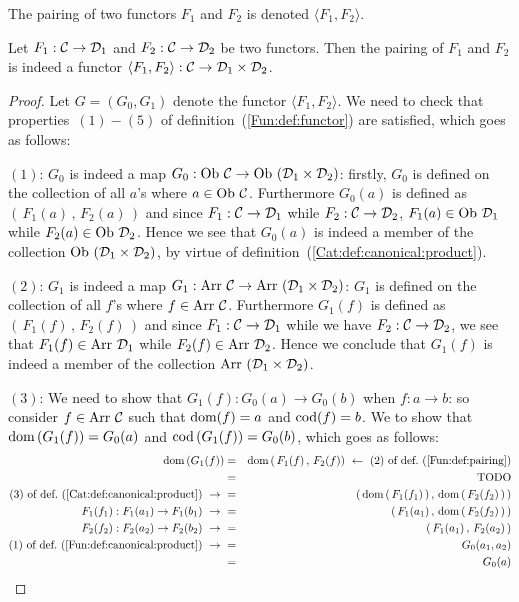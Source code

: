 \begin{notation}\label{Fun:notation:pairing}
    The pairing of two functors $F_{1}$ and $F_{2}$ is denoted
    $\langle F_{1}, F_{2}\rangle$.
\end{notation}
\begin{prop}\label{Fun:prop:pairing}
    Let $F_{1}:\mbox{$\cal C$}\to\mbox{${\cal D}_{1}$}$ and $F_{2}:\mbox{$\cal C$}\to\mbox{${\cal D}_{2}$}$ be two functors. Then 
    the pairing of $F_{1}$ and $F_{2}$ is indeed a functor 
    $\langle F_{1}, F_{2}\rangle : \mbox{$\cal C$}\to\mbox{${\cal D}_{1}$}\times\mbox{${\cal D}_{2}$}$.
\end{prop}
\begin{proof}
    Let $G=(G_{0},G_{1})$ denote the functor $\langle F_{1}, F_{2}\rangle$.
    We need to check that properties~$(1)-(5)$ of 
    definition~(\ref{Fun:def:functor}) are satisfied, which goes as follows:

    $(1)$: $G_{0}$ is indeed a map $G_{0}:\mbox{\rm Ob}\ \mbox{$\cal C$}\to\mbox{\rm Ob}\ (\mbox{${\cal D}_{1}$}
    \times\mbox{${\cal D}_{2}$})$: firstly, $G_{0}$ is defined on the 
    collection of all $a$'s where $a\in\mbox{\rm Ob}\ \mbox{$\cal C$}$. Furthermore 
    $G_{0}(a)$ is defined as $(\,F_{1}(a)\,,\,F_{2}(a)\,)$ and since 
    $F_{1}:\mbox{$\cal C$}\to\mbox{${\cal D}_{1}$}$ while $F_{2}:\mbox{$\cal C$}\to\mbox{${\cal D}_{2}$}$, $F_{1}(a)
    \in\mbox{\rm Ob}\ \mbox{${\cal D}_{1}$}$ while $F_{2}(a)\in\mbox{\rm Ob}\ \mbox{${\cal D}_{2}$}$. Hence we see that
    $G_{0}(a)$ is indeed a member of the collection $\ob\ (\Done\times\Dtwo)$,
    by virtue of definition~(\ref{Cat:def:canonical:product}).
    
    $(2)$: $G_{1}$ is indeed a map $G_{1}:\arr\ \Cat\to\arr\ (\Done
    \times\Dtwo)$: $G_{1}$ is defined on the 
    collection of all $f$'s where $f\in\mbox{\rm Arr}\ \mbox{$\cal C$}$. Furthermore
    $G_{1}(f)$ is defined as $(\,F_{1}(f)\,,\,F_{2}(f)\,)$ and since 
    $F_{1}:\mbox{$\cal C$}\to\mbox{${\cal D}_{1}$}$ while we have $F_{2}:\mbox{$\cal C$}\to\mbox{${\cal D}_{2}$}$, we see that
    $F_{1}(f)\in\mbox{\rm Arr}\ \mbox{${\cal D}_{1}$}$ while $F_{2}(f)\in\mbox{\rm Arr}\ \mbox{${\cal D}_{2}$}$. Hence we 
    conclude that $G_{1}(f)$ is indeed a member of the collection 
    $\arr\ (\Done\times\Dtwo)$.

    $(3)$: We need to show that $G_{1}(f):G_{0}(a)\to G_{0}(b)$ when
    $f:a\to b$: so consider $f\in\mbox{\rm Arr}\ \mbox{$\cal C$}$ such that $\mbox{\rm dom}(f)=a$ and 
    $\mbox{\rm cod}(f)=b$. We to show that $\mbox{\rm dom}\,(G_{1}(f))=G_{0}(a)$
    and $\mbox{\rm cod}\,(G_{1}(f))=G_{0}(b)$, which goes as follows:
        \begin{eqnarray*}\dom\,(G_{1}(f))
            &=&\dom\,(\,F_{1}(f)\,,\,F_{2}(f))\ \leftarrow \
            \mbox{$(2)$ of def.~(\ref{Fun:def:pairing})}\\
            &=&\mbox{TODO}\\
            \mbox{$(3)$ of def.~(\ref{Cat:def:canonical:product})}\ \to\ 
            &=&(\,\dom\,(\,F_{1}(f_{1})\,)\,,\,\dom\,(\,F_{2}(f_{2})\,)\,)\\
            F_{1}(f_{1}):F_{1}(a_{1})\to F_{1}(b_{1})\ \to\ 
            &=&(\,F_{1}(a_{1})\,,\,\dom\,(\,F_{2}(f_{2})\,)\,)\\
            F_{2}(f_{2}):F_{2}(a_{2})\to F_{2}(b_{2})\ \to\ 
            &=&(\,F_{1}(a_{1})\,,\,F_{2}(a_{2})\,)\\
            \mbox{$(1)$ of def.~(\ref{Fun:def:canonical:product})}\ \to\ 
            &=&G_{0}(a_{1},a_{2})\\
            &=&G_{0}(a)
        \end{eqnarray*}
 
\end{proof}



